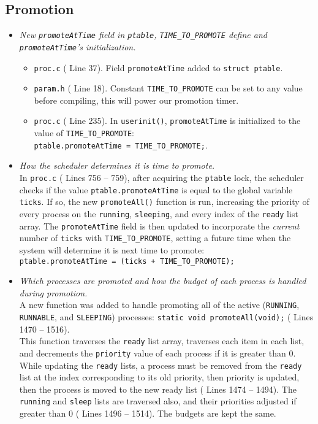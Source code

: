 \documentclass[11pt,letterpaper]{report}
\begin{document}
	\subsection{Promotion}
	\begin{itemize}
		\item \emph{New {\tt promoteAtTime} field in {\tt ptable}, {\tt TIME\_TO\_PROMOTE} define and {\tt promoteAtTime}'s initialization.}\\
		\begin{itemize}
			\item {\tt proc.c} ({\color{red} Line 37}). Field {\tt promoteAtTime} added to {\tt struct ptable}.
			\item {\tt param.h} ({\color{red} Line 18}). Constant {\tt TIME\_TO\_PROMOTE} can be set to any value before compiling, this will power our promotion timer.
			\item  {\tt proc.c} ({\color{red} Line 235}). In {\tt userinit()}, {\tt promoteAtTime} is initialized to the value of {\tt TIME\_TO\_PROMOTE}:\\
			{\tt ptable.promoteAtTime = TIME\_TO\_PROMOTE;}.
		\end{itemize}
		
		\item \emph{How the scheduler determines it is time to promote.}\\
		In {\tt proc.c} ({\color{red} Lines 756 -- 759}), after acquiring the {\tt ptable} lock, the scheduler checks if the value {\tt ptable.promoteAtTime} is equal to the global variable {\tt ticks}. If so, the new {\tt promoteAll()} function is run, increasing the priority of every process on the {\tt running}, {\tt sleeping}, and every index of the {\tt ready} list array. The {\tt promoteAtTime} field is then updated to incorporate the \emph{current} number of {\tt ticks} with {\tt TIME\_TO\_PROMOTE}, setting a future time when the system will determine it is next time to promote:\\
		{\tt ptable.promoteAtTime = (ticks + TIME\_TO\_PROMOTE);}
		
		\item \emph{Which processes are promoted and how the budget of each process is handled during promotion.}\\
		A new function was added to handle promoting all of the active ({\tt RUNNING}, {\tt RUNNABLE}, and {\tt SLEEPING}) processes: {\tt static void promoteAll(void);} ({\color{red} Lines 1470 -- 1516}).\\
		This function traverses the {\tt ready} list array, traverses each item in each list, and decrements the {\tt priority} value of each process if it is greater than 0. While updating the {\tt ready} lists, a process must be removed from the {\tt ready} list at the index corresponding to its old priority, then priority is updated, then the process is moved to the new ready list ({\color{red} Lines 1474 -- 1494}). The {\tt running} and {\tt sleep} lists are traversed also, and their priorities adjusted if greater than 0 ({\color{red} Lines 1496 -- 1514}). The budgets are kept the same. 
		

\end{itemize}
\end{document}
